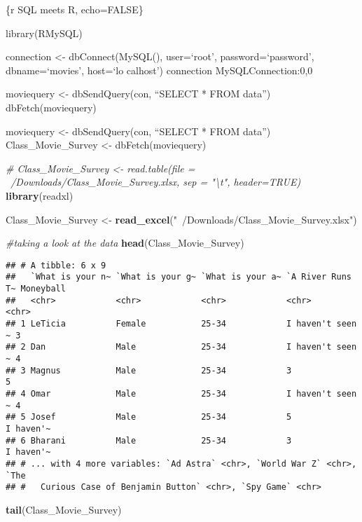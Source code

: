 \documentclass[]{article}
\newenvironment{Shaded}{\begin{snugshade}}{\end{snugshade}}
\newcommand{\CommentTok}[1]{\textcolor[rgb]{0.56,0.35,0.01}{\textit{#1}}}
\newcommand{\KeywordTok}[1]{\textcolor[rgb]{0.13,0.29,0.53}{\textbf{#1}}}
\newcommand{\NormalTok}[1]{#1}
\newcommand{\StringTok}[1]{\textcolor[rgb]{0.31,0.60,0.02}{#1}}
\begin{document}
\{r SQL meets R, echo=FALSE\}

library(RMySQL)

connection \textless{}- dbConnect(MySQL(), user=`root',
password=`password', dbname=`movies', host=`lo calhost') connection
MySQLConnection:0,0

moviequery \textless{}- dbSendQuery(con, ``SELECT * FROM data'')
dbFetch(moviequery)

moviequery \textless{}- dbSendQuery(con, ``SELECT * FROM data'')
Class\_Movie\_Survey \textless{}- dbFetch(moviequery)

\begin{Shaded}
\begin{Highlighting}[]
\CommentTok{# Class_Movie_Survey <- read.table(file = ~/Downloads/Class_Movie_Survey.xlsx, sep = "\textbackslash{}t", header=TRUE)}
\KeywordTok{library}\NormalTok{(readxl)}

\NormalTok{Class_Movie_Survey <-}\StringTok{ }\KeywordTok{read_excel}\NormalTok{(}\StringTok{"~/Downloads/Class_Movie_Survey.xlsx"}\NormalTok{)}

\CommentTok{#taking a look at the data}
\KeywordTok{head}\NormalTok{(Class_Movie_Survey)}
\end{Highlighting}
\end{Shaded}

\begin{verbatim}
## # A tibble: 6 x 9
##   `What is your n~ `What is your g~ `What is your a~ `A River Runs T~ Moneyball
##   <chr>            <chr>            <chr>            <chr>            <chr>    
## 1 LeTicia          Female           25-34            I haven't seen ~ 3        
## 2 Dan              Male             25-34            I haven't seen ~ 4        
## 3 Magnus           Male             25-34            3                5        
## 4 Omar             Male             25-34            I haven't seen ~ 4        
## 5 Josef            Male             25-34            5                I haven'~
## 6 Bharani          Male             25-34            3                I haven'~
## # ... with 4 more variables: `Ad Astra` <chr>, `World War Z` <chr>, `The
## #   Curious Case of Benjamin Button` <chr>, `Spy Game` <chr>
\end{verbatim}

\begin{Shaded}
\begin{Highlighting}[]
\KeywordTok{tail}\NormalTok{(Class_Movie_Survey)}
\end{Highlighting}
\end{Shaded}
\end{document}
